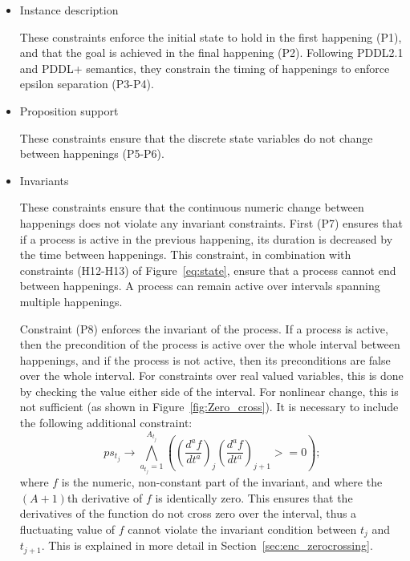 
\begin{itemize}

\item Instance description

These constraints enforce the initial state to hold in the first happening (P1), and that the goal is achieved in the final happening (P2). Following PDDL2.1 and PDDL+ semantics, they constrain the timing of happenings to enforce epsilon separation (P3-P4).

\item Proposition support

These constraints ensure that the discrete state variables do not change between happenings (P5-P6).

\item Invariants

These constraints ensure that the continuous numeric change between happenings does not violate any invariant constraints. First (P7) ensures that if a process is active in the previous happening, its duration is decreased by the time between happenings. This constraint, in combination with constraints (H12-H13) of Figure~\ref{eq:state}, ensure that a process cannot end between happenings. A process can remain active over intervals spanning multiple happenings.

Constraint (P8) enforces the invariant of the process. If a process is active, then the precondition of the process is active over the whole interval between happenings, and if the process is not active, then its preconditions are false over the whole interval. For constraints over real valued variables, this is done by checking the value either side of the interval. For nonlinear change, this is not sufficient (as shown in Figure~\ref{fig:Zero_cross}). It is necessary to include the following additional constraint:
$$
ps_{t_j} \rightarrow \bigwedge^{A_{t_j}}_{a_{t_j}=1} \left((\frac{d^af}{dt^a})_j(\frac{d^af}{dt^a})_{j+1} >= 0\right); 
$$
where $f$ is the numeric, non-constant part of the invariant, and where the $(A+1)$th derivative of $f$ is identically zero. This ensures that the derivatives of the function do not cross zero over the interval, thus a fluctuating value of $f$ cannot violate the invariant condition between $t_j$ and $t_{j+1}$. This is explained in more detail in Section~\ref{sec:enc_zerocrossing}.


\end{itemize}
